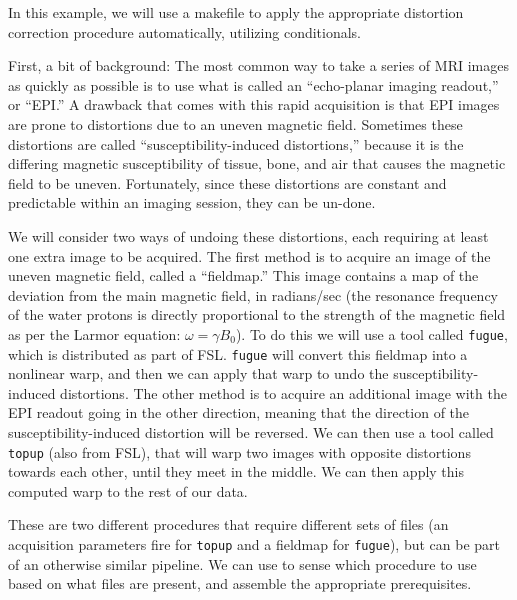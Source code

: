 
In this example, we will use a makefile to apply the appropriate distortion correction procedure automatically, utilizing conditionals.

First, a bit of background: The most common way to take a series of MRI images as quickly as possible is to use what is called an ``echo-planar imaging readout,'' or ``EPI.'' A drawback that comes with this rapid acquisition is that EPI images are prone to distortions due to an uneven magnetic field. Sometimes these distortions are called ``susceptibility-induced distortions,'' because it is the differing magnetic susceptibility of tissue, bone, and air that causes the magnetic field to be uneven. Fortunately, since these distortions are constant and predictable within an imaging session, they can be un-done.

We will consider two ways of undoing these distortions, each requiring at least one extra image to be acquired. The first method is to acquire an image of the uneven magnetic field, called a ``fieldmap.'' This image contains a map of the deviation from the main magnetic field, in radians/sec (the resonance frequency of the water protons is directly proportional to the strength of the magnetic field as per the Larmor equation: $\omega=\gamma B _{0}$). To do this we will use a tool called \texttt{fugue}, which is distributed as part of FSL. \texttt{fugue} will convert this fieldmap into a nonlinear warp, and then we can apply that warp to undo the susceptibility-induced distortions. The other method is to acquire an additional image with the EPI readout going in the other direction, meaning that the direction of the susceptibility-induced distortion will be reversed. We can then use a tool called \texttt{topup} (also from FSL), that will warp two images with opposite distortions towards each other, until they meet in the middle. We can then apply this computed warp to the rest of our data.

These are two different procedures that require different sets of files (an acquisition parameters fire for \texttt{topup} and a fieldmap for \texttt{fugue}), but can be part of an otherwise similar pipeline. We can use \maken{} to sense which procedure to use based on what files are present, and assemble the appropriate prerequisites.


